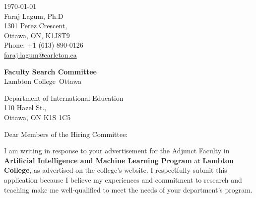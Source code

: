 \documentclass[letterpaper,11pt,oneside]{article}
\newcommand{\ignore}[1]{}
\begin{document}
\ignore
{

}

\clearpage
\setlength\parindent{0cm}




\def\youruniversity{Lambton College}

\def\yourfiled{Artificial Intelligence and Machine Learning Program}
\def\carletonaddress{The School of Computer Science                  \\
HP5302, 1125 Colonel By Drive,  \\
Ottawa, ON K1S 5B6
}


\def\lambtoncollageaddress{Department of International Education \\
110 Hazel St., \\
Ottawa, ON K1S 1C5}

\begin{flushright}
 \today                           \\
 \vspace{1em}                              
 Faraj Lagum, Ph.D            \\
 1301 Perez Crescent,                       \\
 Ottawa, ON, K1J8T9   \\
 Phone: +1 (613) 890-0126        \\
\href{mailto:faraj.lagum@carleton.ca}{faraj.lagum@carleton.ca}  \\ %
\end{flushright}


\begin{flushleft}
 \textbf{Faculty Search Committee}         \\
 \youruniversity \ Ottawa
 
 
\lambtoncollageaddress
\end{flushleft}

\vspace{2em}

Dear Members of the Hiring Committee: \\
\vspace{1em}
\onehalfspacing

I am writing in response to your advertisement for the Adjunct Faculty in  \textbf{Artificial Intelligence and Machine Learning Program} at \textbf{\youruniversity}, as advertised on the college's website. I respectfully submit this application because I believe my experiences and commitment to research and teaching make me well-qualified to meet the needs of your department's program.
\end{document}
